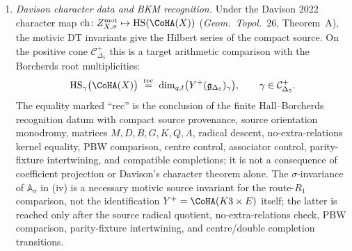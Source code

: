 \begin{conjecture}
\begin{enumerate}[label=\textup{(\roman*)},leftmargin=1.5em]
 \[
 \mathbb A_\sigma \;=\; \prod_{\ell}^{\arg_\sigma} \mathbb U_\ell^{\Omega^{\mathrm{mot}}_\ell(\sigma)}
 \]
 is \emph{independent of $\sigma$ on $\mathrm{Stab}^{\mathrm{OPi}}(X)$}: for $\sigma, \sigma' \in \mathrm{Stab}^{\mathrm{OPi}}(X)$, $\mathbb A_\sigma = \mathbb A_{\sigma'}$ in $\mathbb T_\Lambda^{\mathrm{mot}}$. Individual $\Omega^{\mathrm{mot}}(\gamma; \sigma)$ depend on $\sigma$; the total class in $K_0$ of the quantum torus does not.
 \item \emph{Davison character data and BKM recognition.} Under the Davison 2022 character map $\mathrm{ch}\colon Z^{\mathrm{mot}}_{X, \sigma} \mapsto \mathrm{HS}(\CoHA(X))$ (\emph{Geom.\ Topol.}\ 26, Theorem~A), the motivic DT invariants give the Hilbert series of the compact source. On the positive cone $\mathcal C_{\Delta_5}^+$ this is a target arithmetic comparison with the Borcherds root multiplicities:
 \[
 \mathrm{HS}_{\gamma}\bigl(\CoHA(X)\bigr)
 \;\stackrel{\mathrm{rec}}{=}\;
 \dim_{q, t}\bigl(Y^+(\mathfrak g_{\Delta_5})_\gamma\bigr),
 \qquad \gamma \in \mathcal C_{\Delta_5}^+.
 \]
The equality marked ``rec'' is the conclusion of the finite Hall--Borcherds recognition datum with compact source provenance, source orientation monodromy, matrices $M,D,B,G,K,Q,A$, radical descent, no-extra-relations kernel equality, PBW comparison, centre control, associator control, parity-fixture intertwining, and compatible completions; it is not a consequence of coefficient projection or Davison's character theorem alone. The $\sigma$-invariance of $\mathbb A_\sigma$ in (iv) is a necessary motivic source invariant for the route-$R_1$ comparison, not the identification $Y^+ = \CoHA(K3 \times E)$ itself; the latter is reached only after the source radical quotient, no-extra-relations check, PBW comparison, parity-fixture intertwining, and centre/double completion transitions.
\end{enumerate}
\end{conjecture}

